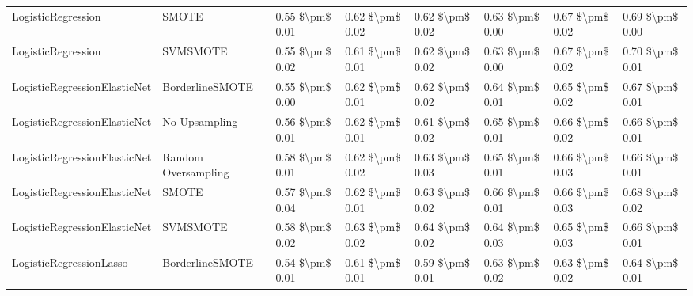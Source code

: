 \begin{tabular}{llllllll}
             LogisticRegression &                         SMOTE & 0.55 \$\textbackslash pm\$ 0.01 &           0.62 \$\textbackslash pm\$ 0.02 &       0.62 \$\textbackslash pm\$ 0.02 &        0.63 \$\textbackslash pm\$ 0.00 &                         0.67 \$\textbackslash pm\$ 0.02 &     0.69 \$\textbackslash pm\$ 0.00 \\
             LogisticRegression &                      SVMSMOTE & 0.55 \$\textbackslash pm\$ 0.02 &           0.61 \$\textbackslash pm\$ 0.01 &       0.62 \$\textbackslash pm\$ 0.02 &        0.63 \$\textbackslash pm\$ 0.00 &                         0.67 \$\textbackslash pm\$ 0.02 &     0.70 \$\textbackslash pm\$ 0.01 \\
   LogisticRegressionElasticNet &               BorderlineSMOTE & 0.55 \$\textbackslash pm\$ 0.00 &           0.62 \$\textbackslash pm\$ 0.01 &       0.62 \$\textbackslash pm\$ 0.02 &        0.64 \$\textbackslash pm\$ 0.01 &                         0.65 \$\textbackslash pm\$ 0.02 &     0.67 \$\textbackslash pm\$ 0.01 \\
   LogisticRegressionElasticNet &                 No Upsampling & 0.56 \$\textbackslash pm\$ 0.01 &           0.62 \$\textbackslash pm\$ 0.01 &       0.61 \$\textbackslash pm\$ 0.02 &        0.65 \$\textbackslash pm\$ 0.01 &                         0.66 \$\textbackslash pm\$ 0.02 &     0.66 \$\textbackslash pm\$ 0.01 \\
   LogisticRegressionElasticNet &           Random Oversampling & 0.58 \$\textbackslash pm\$ 0.01 &           0.62 \$\textbackslash pm\$ 0.02 &       0.63 \$\textbackslash pm\$ 0.03 &        0.65 \$\textbackslash pm\$ 0.01 &                         0.66 \$\textbackslash pm\$ 0.03 &     0.66 \$\textbackslash pm\$ 0.01 \\
   LogisticRegressionElasticNet &                         SMOTE & 0.57 \$\textbackslash pm\$ 0.04 &           0.62 \$\textbackslash pm\$ 0.01 &       0.63 \$\textbackslash pm\$ 0.02 &        0.66 \$\textbackslash pm\$ 0.01 &                         0.66 \$\textbackslash pm\$ 0.03 &     0.68 \$\textbackslash pm\$ 0.02 \\
   LogisticRegressionElasticNet &                      SVMSMOTE & 0.58 \$\textbackslash pm\$ 0.02 &           0.63 \$\textbackslash pm\$ 0.02 &       0.64 \$\textbackslash pm\$ 0.02 &        0.64 \$\textbackslash pm\$ 0.03 &                         0.65 \$\textbackslash pm\$ 0.03 &     0.66 \$\textbackslash pm\$ 0.01 \\
        LogisticRegressionLasso &               BorderlineSMOTE & 0.54 \$\textbackslash pm\$ 0.01 &           0.61 \$\textbackslash pm\$ 0.01 &       0.59 \$\textbackslash pm\$ 0.01 &        0.63 \$\textbackslash pm\$ 0.02 &                         0.63 \$\textbackslash pm\$ 0.02 &     0.64 \$\textbackslash pm\$ 0.01 \\

\end{tabular}
